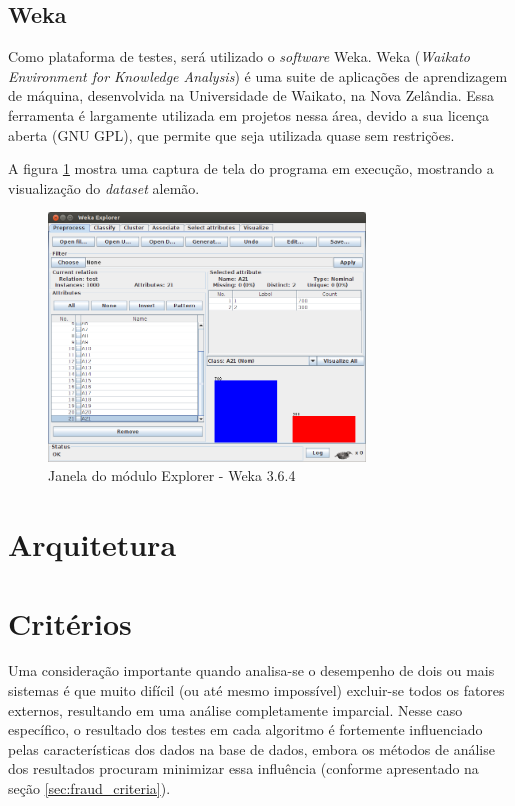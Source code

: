 \subsection{Weka}

Como plataforma de testes, será utilizado o \emph{software} Weka. Weka (\emph{Waikato Environment for Knowledge Analysis}) é uma suite de aplicações de aprendizagem de máquina, desenvolvida na Universidade de Waikato, na Nova Zelândia. Essa ferramenta é largamente utilizada em projetos nessa área, devido a sua licença aberta (GNU GPL), que permite que seja utilizada quase sem restrições.

A figura \ref{fig:prop_weka} mostra uma captura de tela do programa em execução, mostrando a visualização do \emph{dataset} alemão.

\begin{figure}[h!]
\centering
\includegraphics[width=0.75\textwidth]{img/weka.png}
\caption{Janela do módulo Explorer - Weka 3.6.4}
\label{fig:prop_weka}
\end{figure}

\section{Arquitetura}

\section{Critérios}

Uma consideração importante quando analisa-se o desempenho de dois ou mais sistemas é que muito difícil (ou até mesmo impossível) excluir-se todos os fatores externos, resultando em uma análise completamente imparcial. Nesse caso específico, o resultado dos testes em cada algoritmo é fortemente influenciado pelas características dos dados na base de dados, embora os métodos de análise dos resultados procuram minimizar essa influência (conforme apresentado na seção \ref{sec:fraud_criteria}).

